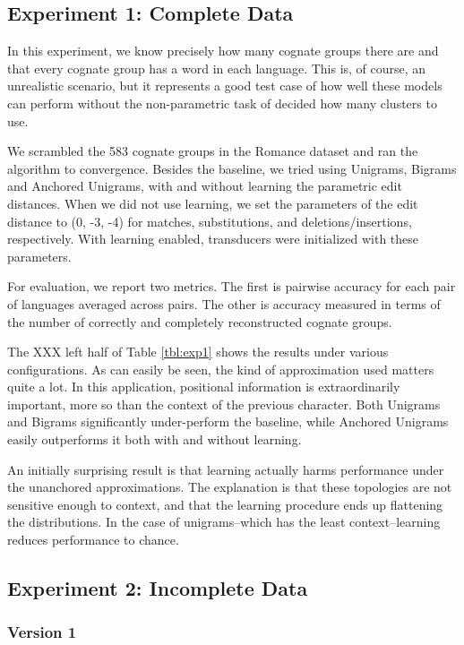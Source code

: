 \documentclass[11pt,a4paper]{article}
\begin{document}
\subsection{Experiment 1: Complete Data}

In this experiment, we know precisely how many cognate groups there
are and that every cognate group has a word in each language. This
is, of course, an unrealistic scenario, but it represents a good
test case of how well these models can perform without the
non-parametric task of decided how many clusters to use.

We scrambled the 583 cognate groups in the Romance dataset and ran
the algorithm to convergence. Besides the baseline, we tried using
Unigrams, Bigrams and Anchored Unigrams, with and without learning
the parametric edit distances. When we did not use learning, we set
the parameters of the edit distance to (0, -3, -4) for matches,
substitutions, and deletions/insertions, respectively. With learning
enabled, transducers were initialized with these parameters.

For evaluation, we report two metrics. The first is pairwise accuracy
for each pair of languages averaged across pairs. The other is
accuracy measured in terms of the number of correctly and completely
reconstructed cognate groups.

The XXX left half of Table \ref{tbl:exp1} shows the results under
various configurations. As can easily be seen, the kind of approximation
used matters quite a lot. In this application, positional information
is extraordinarily important, more so than the context of the
previous character. Both Unigrams and Bigrams significantly
under-perform the baseline, while Anchored Unigrams easily outperforms
it both with and without learning.

An initially surprising result is that learning actually harms
performance under the unanchored approximations. The explanation
is that these topologies are not sensitive enough to context, and
that the learning procedure ends up flattening the distributions.
In the case of unigrams--which has the least context--learning
reduces performance to chance.

\subsection{Experiment 2: Incomplete Data}

\subsubsection{Version 1}
\end{document}
